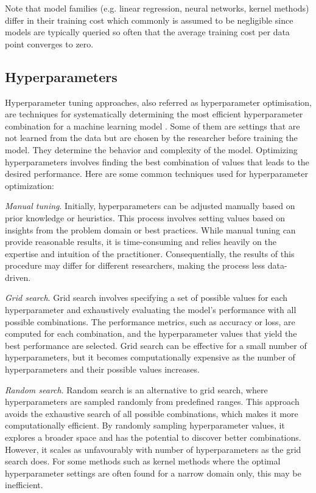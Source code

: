 \documentclass[9pt,bestpractices]{livecoms}
\begin{document}
Note that model families (e.g. linear regression, neural networks, kernel methods) differ in their training cost which commonly is assumed to be negligible since models are typically queried so often that the average training cost per data point converges to zero.

\subsection{Hyperparameters}
Hyperparameter tuning approaches, also referred as hyperparameter optimisation, are techniques for systematically determining the most efficient hyperparameter combination for a machine learning model \cite{keith2021combining}. Some of them are settings that are not learned from the data but are chosen
by the researcher before training the model. They determine the behavior and
complexity of the model. Optimizing hyperparameters involves finding the best
combination of values that leads to the desired performance. Here are some
common techniques used for hyperparameter optimization:

\textit{Manual tuning}. Initially, hyperparameters can be adjusted manually
based on prior knowledge or heuristics. This process involves setting values
based on insights from the problem domain or best practices. While manual tuning
can provide reasonable results, it is time-consuming and relies heavily on the
expertise and intuition of the practitioner. Consequentially, the results of this procedure may differ for different researchers, making the process less data-driven.

\textit{Grid search}. Grid search involves specifying a set of possible values
for each hyperparameter and exhaustively evaluating the model's performance with
all possible combinations. The performance metrics, such as accuracy or loss,
are computed for each combination, and the hyperparameter values that yield the
best performance are selected. Grid search can be effective for a small number
of hyperparameters, but it becomes computationally expensive as the number of
hyperparameters and their possible values increases.

\textit{Random search}. Random search is an alternative to grid search, where
hyperparameters are sampled randomly from predefined ranges. This approach
avoids the exhaustive search of all possible combinations, which makes it more
computationally efficient. By randomly sampling hyperparameter values, it
explores a broader space and has the potential to discover better combinations. However, it scales as unfavourably with number of hyperparameters as the grid search does. For some methods such as kernel methods where the optimal hyperparameter settings are often found for a narrow domain only, this may be inefficient.
\end{document}
